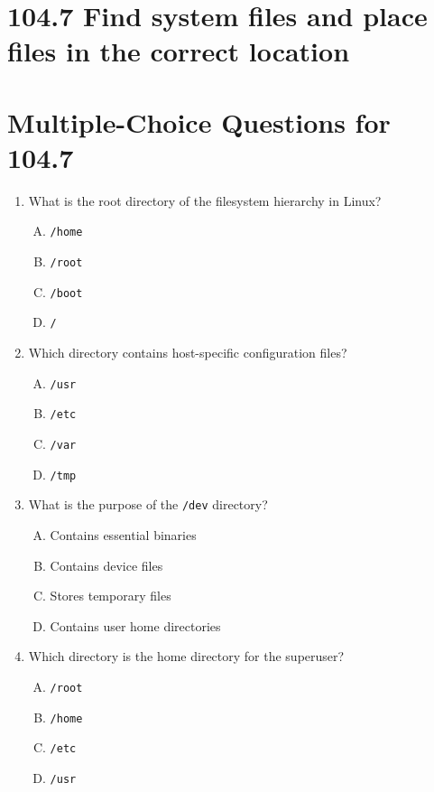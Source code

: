 \documentclass[a4paper]{report}
\begin{document}
\section*{104.7 Find system files and place files in the correct location}

\newpage
\section*{Multiple-Choice Questions for 104.7}
\begin{enumerate}[1.]

    \item What is the root directory of the filesystem hierarchy in Linux?  
    \begin{enumerate}[A)]
        \item \texttt{/home}  
        \item \texttt{/root}  
        \item \texttt{/boot}  
        \item \texttt{/}  
    \end{enumerate}

    \item Which directory contains host-specific configuration files?  
    \begin{enumerate}[A)]
        \item \texttt{/usr}  
        \item \texttt{/etc}  
        \item \texttt{/var}  
        \item \texttt{/tmp}  
    \end{enumerate}

    \item What is the purpose of the \texttt{/dev} directory?  
    \begin{enumerate}[A)]
        \item Contains essential binaries  
        \item Contains device files  
        \item Stores temporary files  
        \item Contains user home directories  
    \end{enumerate}

    \item Which directory is the home directory for the superuser?  
    \begin{enumerate}[A)]
        \item \texttt{/root}  
        \item \texttt{/home}  
        \item \texttt{/etc}  
        \item \texttt{/usr}  
    \end{enumerate}


\end{enumerate}
\end{document}
